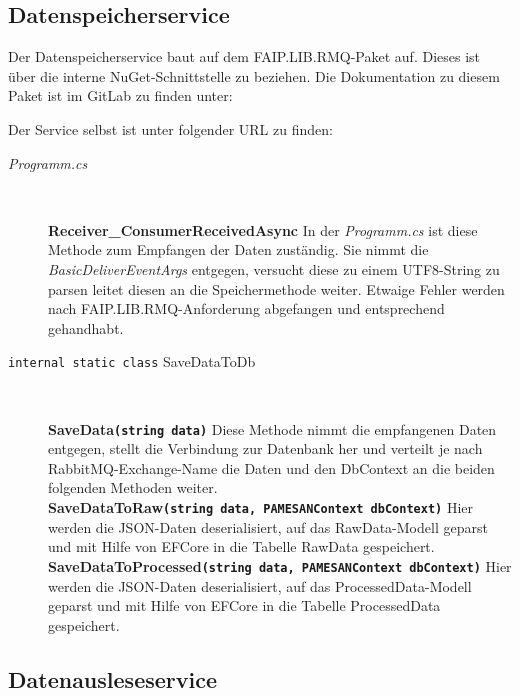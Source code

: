 \newpage
\subsection{Datenspeicherservice}

Der Datenspeicherservice baut auf dem FAIP.LIB.RMQ-Paket auf. Dieses ist über die interne NuGet-Schnittstelle zu beziehen. Die Dokumentation zu diesem Paket ist im GitLab zu finden unter:


Der Service selbst ist unter folgender URL zu finden:


\begin{description}
  \item[\textit{Programm.cs}] \
    \begin{addmargin}{0.2cm}
      \textbf{Receiver\_ConsumerReceivedAsync} In der \textit{Programm.cs} ist diese Methode zum Empfangen der Daten zuständig. Sie nimmt die \textit{BasicDeliverEventArgs} entgegen, versucht diese zu einem UTF8-String zu parsen leitet diesen an die Speichermethode weiter. Etwaige Fehler werden nach FAIP.LIB.RMQ-Anforderung abgefangen und entsprechend gehandhabt.
    \end{addmargin}
  \item[\texttt{internal static class} SaveDataToDb] \
    \begin{addmargin}{0.2cm}
      \textbf{SaveData\texttt{(string data)}} Diese Methode nimmt die empfangenen Daten entgegen, stellt die Verbindung zur Datenbank her und verteilt je nach RabbitMQ-Exchange-Name die Daten und den DbContext an die beiden folgenden Methoden weiter. \\
      \textbf{SaveDataToRaw\texttt{(string data, PAMESANContext dbContext)}} Hier werden die JSON-Daten deserialisiert, auf das RawData-Modell geparst und mit Hilfe von EFCore in die Tabelle RawData gespeichert.  \\
      \textbf{SaveDataToProcessed\texttt{(string data, PAMESANContext dbContext)}} Hier werden die JSON-Daten deserialisiert, auf das ProcessedData-Modell geparst und mit Hilfe von EFCore in die Tabelle ProcessedData gespeichert.  \\
    \end{addmargin}
\end{description}


\newpage
\subsection{Datenausleseservice}

